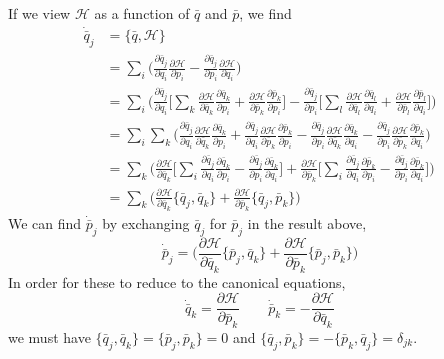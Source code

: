 \documentclass[../principles-of-quantum-mechanics.tex]{subfiles}
\begin{document}
\begin{questions}
		\begin{solution}
			If we view $\mathcal{H}$ as a function of $\bar{q}$ and $\bar{p}$, we find
			\begin{align*}
				\dot{\bar{q}}_j &= \{\bar{q}, \mathcal{H}\} \\
				&= \sum_i\Big(\frac{\partial\bar{q}_j}{\partial q_i}\frac{\partial\mathcal{H}}{\partial p_i} - \frac{\partial\bar{q}_j}{\partial p_i}\frac{\partial\mathcal{H}}{\partial q_i}\Big) \\
				&= \sum_i\Big(\frac{\partial\bar{q}_j}{\partial q_i}\Big[\sum_k\frac{\partial\mathcal{H}}{\partial\bar{q}_k}\frac{\partial\bar{q}_k}{\partial p_i} + \frac{\partial\mathcal{H}}{\partial\bar{p}_k}\frac{\partial \bar{p}_k}{\partial p_i}\Big] - \frac{\partial\bar{q}_j}{\partial p_i}\Big[\sum_l\frac{\partial\mathcal{H}}{\partial\bar{q}_l}\frac{\partial\bar{q}_l}{\partial q_i} + \frac{\partial\mathcal{H}}{\partial\bar{p}_l}\frac{\partial \bar{p}_l}{\partial q_i}\Big] \Big) \\
				&= \sum_i\sum_k\Big(\frac{\partial\bar{q}_j}{\partial q_i}\frac{\partial\mathcal{H}}{\partial\bar{q}_k}\frac{\partial\bar{q}_k}{\partial p_i} + \frac{\partial\bar{q}_j}{\partial q_i}\frac{\partial\mathcal{H}}{\partial\bar{p}_k}\frac{\partial \bar{p}_k}{\partial p_i} - \frac{\partial\bar{q}_j}{\partial p_i}\frac{\partial\mathcal{H}}{\partial\bar{q}_k}\frac{\partial\bar{q}_k}{\partial q_i} - \frac{\partial\bar{q}_j}{\partial p_i}\frac{\partial\mathcal{H}}{\partial\bar{p}_k}\frac{\partial \bar{p}_k}{\partial q_i}\Big) \\
				&= \sum_k\Big(\frac{\partial\mathcal{H}}{\partial\bar{q}_k}\Big[\sum_i\frac{\partial\bar{q}_j}{\partial q_i}\frac{\partial\bar{q}_k}{\partial p_i} - \frac{\partial\bar{q}_j}{\partial p_i}\frac{\partial\bar{q}_k}{\partial q_i}\Big] + \frac{\partial\mathcal{H}}{\partial\bar{p}_k}\Big[\sum_i\frac{\partial\bar{q}_j}{\partial q_i}\frac{\partial \bar{p}_k}{\partial p_i} - \frac{\partial\bar{q}_j}{\partial p_i}\frac{\partial \bar{p}_k}{\partial q_i}\Big]\Big) \\
				&= \sum_k \Big(\frac{\partial\mathcal{H}}{\partial \bar{q}_k}\{\bar{q}_j, \bar{q}_k\} + \frac{\partial\mathcal{H}}{\partial \bar{p}_k}\{\bar{q}_j, \bar{p}_k\} \Big)
			\end{align*}
			We can find $\dot{\bar{p}}_j$ by exchanging $\bar{q}_j$ for $\bar{p}_j$ in the result above,
			\[
				\dot{\bar{p}}_j = \Big(\frac{\partial\mathcal{H}}{\partial \bar{q}_k}\{\bar{p}_j, \bar{q}_k\} + \frac{\partial\mathcal{H}}{\partial \bar{p}_k}\{\bar{p}_j, \bar{p}_k\} \Big)
			\]
			In order for these to reduce to the canonical equations,
			\[
				\dot{\bar{q}}_k = \frac{\partial\mathcal{H}}{\partial\bar{p}_k} \qquad \dot{\bar{p}}_k = -\frac{\partial\mathcal{H}}{\partial\bar{q}_k}
			\]
			we must have $\{\bar{q}_j, \bar{q}_k\} = \{\bar{p}_j, \bar{p}_k\} = 0$ and $\{\bar{q}_j, \bar{p}_k\} = -\{\bar{p}_k, \bar{q}_j\} = \delta_{jk}$.
		\end{solution}
		

\end{questions}
\end{document}
